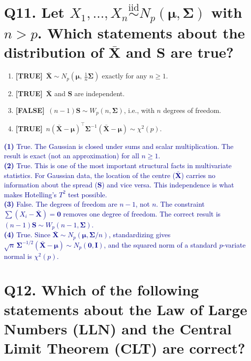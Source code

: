 \documentclass[12pt, a4paper]{article}
\newcommand{\T}{\textcolor{truegreen}{\textbf{[TRUE]}}}
\newcommand{\F}{\textcolor{falsered}{\textbf{[FALSE]}}}
\newcommand{\expl}[1]{\textcolor{darkblue}{\small #1}}
\begin{document}
\section*{Q11. Let $X_1, \ldots, X_n \overset{\mathrm{iid}}{\sim} N_p(\boldsymbol{\mu}, \boldsymbol{\Sigma})$ with $n > p$. Which statements about the distribution of $\bar{\mathbf{X}}$ and $\mathbf{S}$ are true?}

\begin{enumerate}[label=(\arabic*)]
  \item \T\ $\bar{\mathbf{X}} \sim N_p\!\left(\boldsymbol{\mu},\, \frac{1}{n}\boldsymbol{\Sigma}\right)$ exactly for any $n \geq 1$.
  \item \T\ $\bar{\mathbf{X}}$ and $\mathbf{S}$ are independent.
  \item \F\ $(n-1)\mathbf{S} \sim W_p(n, \boldsymbol{\Sigma})$, i.e., with $n$ degrees of freedom.
  \item \T\ $n(\bar{\mathbf{X}} - \boldsymbol{\mu})^\top \boldsymbol{\Sigma}^{-1}(\bar{\mathbf{X}} - \boldsymbol{\mu}) \sim \chi^2(p)$.
\end{enumerate}

\expl{
\textbf{(1)} True. The Gaussian is closed under sums and scalar multiplication. The result is exact (not an approximation) for all $n \geq 1$.\\
\textbf{(2)} True. This is one of the most important structural facts in multivariate statistics. For Gaussian data, the location of the centre ($\bar{\mathbf{X}}$) carries no information about the spread ($\mathbf{S}$) and vice versa. This independence is what makes Hotelling's $T^2$ test possible.\\
\textbf{(3)} False. The degrees of freedom are $n-1$, not $n$. The constraint $\sum(X_i - \bar{\mathbf{X}}) = \mathbf{0}$ removes one degree of freedom. The correct result is $(n-1)\mathbf{S} \sim W_p(n-1, \boldsymbol{\Sigma})$.\\
\textbf{(4)} True. Since $\bar{\mathbf{X}} \sim N_p(\boldsymbol{\mu}, \boldsymbol{\Sigma}/n)$, standardizing gives $\sqrt{n}\,\boldsymbol{\Sigma}^{-1/2}(\bar{\mathbf{X}} - \boldsymbol{\mu}) \sim N_p(\mathbf{0}, \mathbf{I})$, and the squared norm of a standard $p$-variate normal is $\chi^2(p)$.
}

\vspace{1.5em}

\section*{Q12. Which of the following statements about the Law of Large Numbers (LLN) and the Central Limit Theorem (CLT) are correct?}
\end{document}
